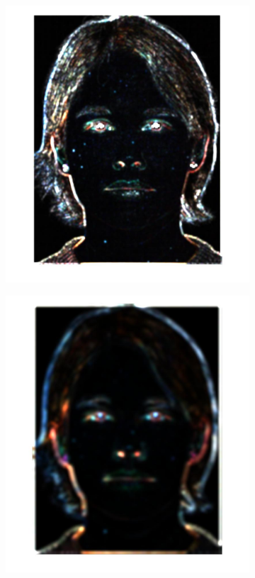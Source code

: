 \documentclass[a4paper]{iacas}
\begin{document}
\begin{figure}[!htbp]
	
	\begin{subfigure}[b]{0.15\textwidth}
		\includegraphics[width=\textwidth]{151.jpg}
		\caption{}
		\label{fig:151}
	\end{subfigure}
	\begin{subfigure}[b]{0.15\textwidth}
		\includegraphics[width=\textwidth]{152.jpg}

\end{subfigure}
\end{figure}
\end{document}
